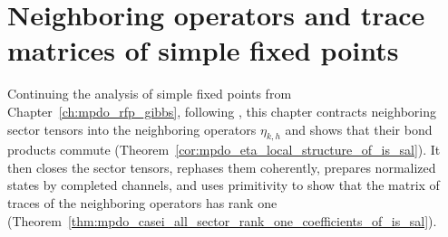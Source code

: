 \chapter{Neighboring operators and trace matrices of simple fixed points}
\label{ch:mpdo_rfp_gibbs_neighboring}

Continuing the analysis of simple fixed points from
Chapter~\ref{ch:mpdo_rfp_gibbs}, following
\cite[Appendix~C.2]{Cirac2016MPDO_arXiv}, this chapter contracts neighboring
sector tensors into the neighboring operators $\eta_{k,h}$ and shows that their
bond products commute
(Theorem~\ref{cor:mpdo_eta_local_structure_of_is_sal}). It then closes the
sector tensors, rephases them coherently, prepares normalized states by
completed channels, and uses primitivity to show that the matrix of traces of
the neighboring operators has rank one
(Theorem~\ref{thm:mpdo_casei_all_sector_rank_one_coefficients_of_is_sal}).


